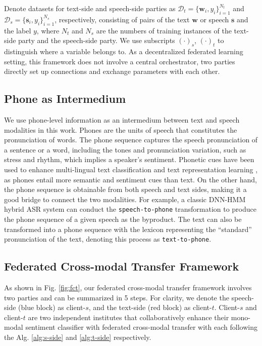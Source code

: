 \documentclass[11pt]{article}
\begin{document}
Denote datasets for text-side and speech-side parties as $\mathcal{D}_t=\{\mathbf{w}_i,y_i\}_{i=1}^{N_t}$ and $\mathcal{D}_s=\{\mathbf{s}_i,y_i\}_{i=1}^{N_s}$, respectively, consisting of pairs of the text $\mathbf{w}$ or speech $\mathbf{s}$ and the label $y$, where $N_t$ and $N_s$ are the numbers of training instances of the text-side party and the speech-side party. We use subscripts $(\cdot)_{s}$, $(\cdot)_{t}$ to distinguish where a variable belongs to. As a decentralized federated learning setting, this framework does not involve a central orchestrator, two parties directly set up connections and exchange parameters with each other.

\subsection{Phone as Intermedium}
We use phone-level information as an intermedium between text and speech modalities in this work. Phones are the units of speech that constitutes the pronunciation of words. The phone sequence captures the speech pronunciation of a sentence or a word, including the tones and pronunciation variation, such as stress and rhythm, which implies a speaker's sentiment. Phonetic cues have been used to enhance multi-lingual text classification \cite{singh2021classification} and text representation learning \cite{peng2021phonetic}, as phones entail more semantic and sentiment cues than text. On the other hand, the phone sequence is obtainable from both speech and text sides, making it a good bridge to connect the two modalities. For example, a classic DNN-HMM hybrid ASR system can conduct the \texttt{speech-to-phone} transformation to produce the phone sequence of a given speech as the byproduct. The text can also be transformed into a phone sequence with the lexicon representing the ``standard'' pronunciation of the text, denoting this process as \texttt{text-to-phone}.

\subsection{Federated Cross-modal Transfer Framework}

As shown in Fig. \ref{fig:fct}, our federated cross-modal transfer framework involves two parties and can be summarized in 5 steps. For clarity, we denote the speech-side (blue block) as client-$s$, and the text-side (red block) as client-$t$. Client-$s$ and client-$t$ are two independent institutes that collaboratively enhance their mono-modal sentiment classifier with federated cross-modal transfer with each following the Alg. \ref{alg:s-side} and \ref{alg:t-side} respectively.
\end{document}
